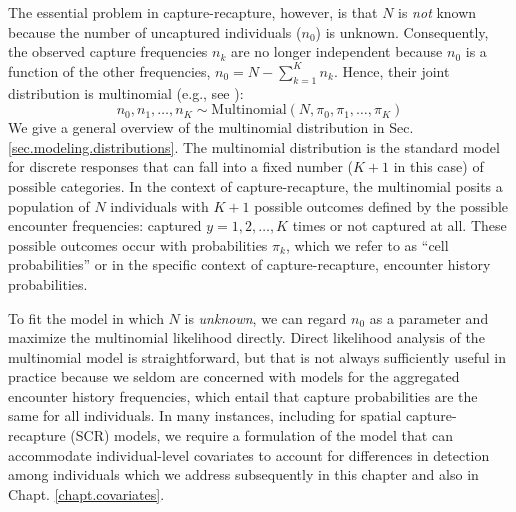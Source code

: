 The essential problem in capture-recapture, however, is that $N$ is
{\it not} known because the number of uncaptured 
individuals ($n_0$)
is unknown. %
Consequently, the observed capture frequencies $n_k$ are no
longer independent because $n_0$ is a function of the other
frequencies, $n_0 = N-\sum_{k=1}^K n_k$. Hence, their joint distribution is multinomial
(e.g., see \citet[][p. 61]{illian_etal:2008}):
\begin{equation}
    n_0, n_1, \ldots, n_K \sim \mathrm{Multinomial}(N, \pi_0, \pi_1, \ldots, \pi_K)
\label{closed.eq.multinomial4m0}
\end{equation}
We give a general overview of the multinomial distribution in
Sec. \ref{sec.modeling.distributions}. The multinomial distribution is
the standard model for discrete responses that can fall into a fixed
number ($K+1$ in this case) of possible categories. In the context of
capture-recapture, the multinomial posits a population of $N$
individuals with $K+1$ possible outcomes defined by the possible
encounter frequencies: captured $y=1,2,\ldots,K$ times or not captured
at all. These possible outcomes occur with
probabilities $\pi_{k}$, which we refer to as ``cell probabilities''
or in the specific context of capture-recapture, encounter history
probabilities.


To fit the model in which $N$ is {\it unknown}, we can regard $n_{0}$ as a
parameter and maximize the multinomial likelihood directly.
Direct likelihood analysis of the multinomial model is
straightforward, but that is not always sufficiently useful in practice
because we seldom are concerned with models for the aggregated
encounter history frequencies, which entail that capture probabilities are the
same for all individuals. In many instances, including for
spatial capture-recapture (SCR) models, we require a formulation of
the model that can accommodate individual-level
covariates to account for
differences in detection among individuals which we
address subsequently in this chapter and also in Chapt. \ref{chapt.covariates}.



